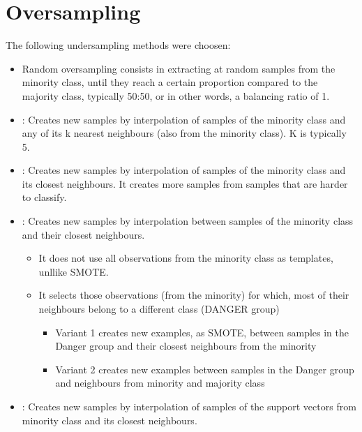 \documentclass[letterpaper,10pt,english]{jupyterBook}
\begin{document}
\section{Oversampling}
\label{\detokenize{Model_evaluation:oversampling}}
\sphinxAtStartPar
The following undersampling methods were choosen:
\begin{itemize}
\item {} 
\sphinxAtStartPar
{} Random over\sphinxhyphen{}sampling consists in extracting at random samples from the minority class, until they reach a certain proportion compared to the majority class, typically 50:50, or in other words, a balancing ratio of 1.

\item {} 
\sphinxAtStartPar
{}: Creates new samples by interpolation of samples of the minority class and any of its k nearest neighbours (also from the minority class). K is typically 5.

\item {} 
\sphinxAtStartPar
{}: Creates new samples by interpolation of samples of the minority class and its closest neighbours. It creates more samples from samples that are harder to classify.

\item {} 
\sphinxAtStartPar
{}: Creates new samples by interpolation between samples of the minority class and their closest neighbours.
\begin{itemize}
\item {} 
\sphinxAtStartPar
It does not use all observations from the minority class as templates, unllike SMOTE.

\item {} 
\sphinxAtStartPar
It selects those observations (from the minority) for which, most of their neighbours belong to a different class (DANGER group)
\begin{itemize}
\item {} 
\sphinxAtStartPar
Variant 1 creates new examples, as SMOTE, between samples in the Danger group and their closest neighbours from the minority

\item {} 
\sphinxAtStartPar
Variant 2 creates new examples between samples in the Danger group and neighbours from minority and majority class

\end{itemize}

\end{itemize}

\item {} 
\sphinxAtStartPar
{}: Creates new samples by interpolation of samples of the support vectors from minority class and its closest neighbours.

\end{itemize}
\end{document}
